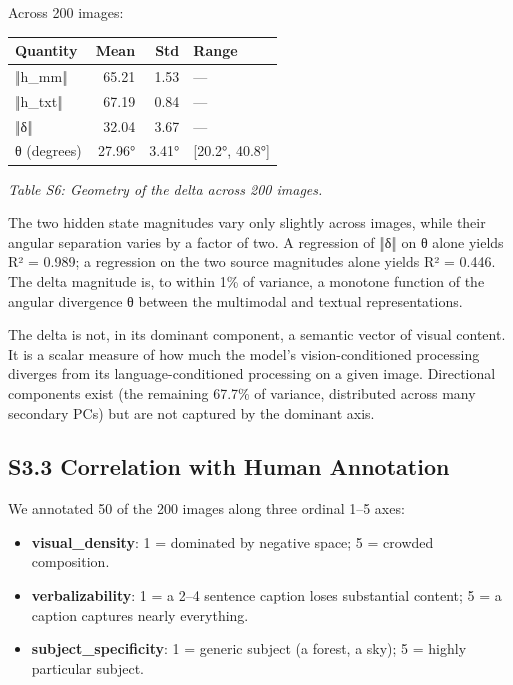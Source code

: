 \documentclass[11pt,a4paper]{article}
\providecommand{\tightlist}{\setlength{\itemsep}{0pt}\setlength{\parskip}{0pt}}
\begin{document}
Across 200 images:

\begin{longtable}[]{@{}lrrl@{}}
\toprule\noalign{}
Quantity & Mean & Std & Range \\
\midrule\noalign{}
\endhead
\bottomrule\noalign{}
\endlastfoot
‖h\_mm‖ & 65.21 & 1.53 & --- \\
‖h\_txt‖ & 67.19 & 0.84 & --- \\
‖δ‖ & 32.04 & 3.67 & --- \\
θ (degrees) & 27.96° & 3.41° & {[}20.2°, 40.8°{]} \\
\end{longtable}

\emph{Table S6: Geometry of the delta across 200 images.}

The two hidden state magnitudes vary only slightly across images, while their angular separation varies by a factor of two. A regression of ‖δ‖ on θ alone yields R² = 0.989; a regression on the two source magnitudes alone yields R² = 0.446. The delta magnitude is, to within 1\% of variance, a monotone function of the angular divergence θ between the multimodal and textual representations.

The delta is not, in its dominant component, a semantic vector of visual content. It is a scalar measure of how much the model's vision-conditioned processing diverges from its language-conditioned processing on a given image. Directional components exist (the remaining 67.7\% of variance, distributed across many secondary PCs) but are not captured by the dominant axis.

\subsection*{S3.3 Correlation with Human Annotation}

We annotated 50 of the 200 images along three ordinal 1--5 axes:

\begin{itemize}
\tightlist
\item
  \textbf{visual\_density}: 1 = dominated by negative space; 5 = crowded composition.
\item
  \textbf{verbalizability}: 1 = a 2--4 sentence caption loses substantial content; 5 = a caption captures nearly everything.
\item
  \textbf{subject\_specificity}: 1 = generic subject (a forest, a sky); 5 = highly particular subject.
\end{itemize}
\end{document}
